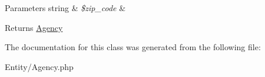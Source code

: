 \begin{DoxyParams}[1]{Parameters}
string & {\em \$zip\+\_\+code} & \\
\hline
\end{DoxyParams}
\begin{DoxyReturn}{Returns}
\mbox{\hyperlink{class_app_1_1_entity_1_1_agency}{Agency}} 
\end{DoxyReturn}


The documentation for this class was generated from the following file\+:\begin{DoxyCompactItemize}
\item 
Entity/Agency.\+php\end{DoxyCompactItemize}
